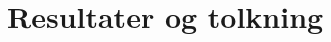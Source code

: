 \documentclass[main.tex]{subfiles}
\begin{document}
\section{Resultater og tolkning}
\label{sec:5}
\end{document}
